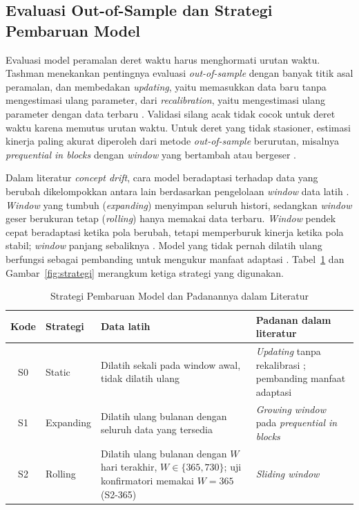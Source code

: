 \subsection{Evaluasi Out-of-Sample dan Strategi Pembaruan Model}
Evaluasi model peramalan deret waktu harus menghormati urutan waktu. Tashman
menekankan pentingnya evaluasi \textit{out-of-sample} dengan banyak titik asal
peramalan, dan membedakan \textit{updating}, yaitu memasukkan data baru tanpa
mengestimasi ulang parameter, dari \textit{recalibration}, yaitu mengestimasi
ulang parameter dengan data terbaru \cite{tashman2000}. Validasi silang
acak tidak cocok untuk deret waktu karena memutus urutan waktu. Untuk deret
yang tidak stasioner, estimasi kinerja paling akurat diperoleh dari metode
\textit{out-of-sample} berurutan, misalnya \textit{prequential in blocks}
dengan \textit{window} yang bertambah atau bergeser \cite{cerqueira2020}.

Dalam literatur \textit{concept drift}, cara model beradaptasi terhadap data
yang berubah dikelompokkan antara lain berdasarkan pengelolaan \textit{window}
data latih \cite{gama2014}. \textit{Window} yang tumbuh
(\textit{expanding}) menyimpan seluruh histori, sedangkan \textit{window}
geser berukuran tetap (\textit{rolling}) hanya memakai data terbaru.
\textit{Window} pendek cepat beradaptasi ketika pola berubah, tetapi
memperburuk kinerja ketika pola stabil; \textit{window} panjang sebaliknya
\cite{gama2014}. Model yang tidak
pernah dilatih ulang berfungsi sebagai pembanding untuk mengukur manfaat
adaptasi \cite{zliobaite2015}. Tabel~\ref{tab:strategi} dan
Gambar~\ref{fig:strategi} merangkum ketiga strategi yang digunakan.

\begin{table}[htbp]
  \caption{Strategi Pembaruan Model dan Padanannya dalam Literatur}
  \label{tab:strategi}
  \centering
  \begingroup
  \small
  \begin{tabular}{|c|l|p{}|p{}|}
    \hline
    \textbf{Kode} & \textbf{Strategi} & \textbf{Data latih} &
    \textbf{Padanan dalam literatur} \\
    \hline
    S0 & Static & Dilatih sekali pada window awal, tidak dilatih ulang &
    \textit{Updating} tanpa rekalibrasi \cite{tashman2000}; pembanding manfaat
    adaptasi \cite{zliobaite2015} \\
    \hline
    S1 & Expanding & Dilatih ulang bulanan dengan seluruh data yang tersedia &
    \textit{Growing window} pada \textit{prequential in blocks}
    \cite{cerqueira2020} \\
    \hline
    S2 & Rolling & Dilatih ulang bulanan dengan $W$ hari terakhir,
    $W \in \{365, 730\}$; uji konfirmatori memakai $W = 365$ (S2-365) &
    \textit{Sliding window} \cite{gama2014,cerqueira2020} \\
    \hline
  \end{tabular}
  \endgroup
\end{table}

